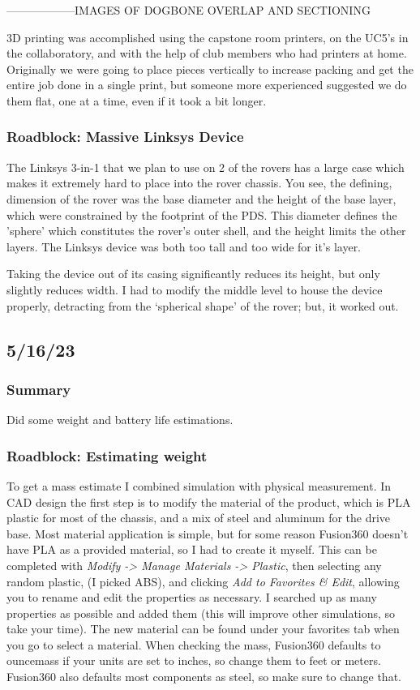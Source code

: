 \documentclass[a4paper, 10pt]{article}
\begin{document}
		------------------IMAGES OF DOGBONE OVERLAP AND SECTIONING
			
		3D printing was accomplished using the capstone room printers, on the UC5's in the collaboratory, and with the help of club members who had printers at home. Originally we were going to place pieces vertically to increase packing and get the entire job done in a single print, but someone more experienced suggested we do them flat, one at a time, even if it took a bit longer.  
			
		\subsubsection{Roadblock: Massive Linksys Device}
		The Linksys 3-in-1 that we plan to use on 2 of the rovers has a large case which makes it extremely hard to place into the rover chassis. You see, the defining, dimension of the rover was the base diameter and the height of the base layer, which were constrained by the footprint of the PDS. This diameter defines the 'sphere' which constitutes the rover's outer shell, and the height limits the other layers. The Linksys device was both too tall and too wide for it's layer.
		
		Taking the device out of its casing significantly reduces its height, but only slightly reduces width. I had to modify the middle level to house the device properly, detracting from the `spherical shape' of the rover; but, it worked out.
		

	\subsection{5/16/23}
		\subsubsection{Summary}
		Did some weight and battery life estimations.
		
		\subsubsection{Roadblock: Estimating weight}
		To get a mass estimate I combined simulation with physical measurement. In CAD design the first step is to modify the material of the product, which is PLA plastic for most of the chassis, and a mix of steel and aluminum for the drive base. Most material application is simple, but for some reason Fusion360 doesn't have PLA as a provided material, so I had to create it myself. This can be completed with \textit{Modify -> Manage Materials -> Plastic}, then selecting any random plastic, (I picked ABS), and clicking \textit{Add to Favorites \& Edit}, allowing you to rename and edit the properties as necessary. I searched up as many properties as possible and added them (this will improve other simulations, so take your time). The new material can be found under your favorites tab when you go to select a material. When checking the mass, Fusion360 defaults to ouncemass if your units are set to inches, so change them to feet or meters. Fusion360 also defaults most components as steel, so make sure to change that.
		
\end{document}
